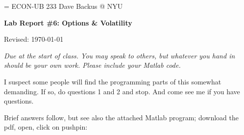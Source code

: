 \documentclass[11pt]{exam}
\begin{document}
\parskip=\bigskipamount
\parindent=0.0in
\thispagestyle{empty}
{\large ECON-UB 233 \hfill Dave Backus @ NYU}

\bigskip\bigskip
\centerline{\Large \bf Lab Report \#6: Options \& Volatility}
\centerline{Revised: \today}

\bigskip
{\it Due at the start of class.
You may speak to others, but whatever you hand in should be your own work.
Please include your Matlab code.

I suspect some people will find the programming parts of this
somewhat demanding.  If so, do questions 1 and 2 and stop.
And come see me if you have questions.
}

\begin{solution}
Brief answers follow,
but see also the attached Matlab program;
download the pdf, open, click on pushpin:
\end{solution}
\end{document}
